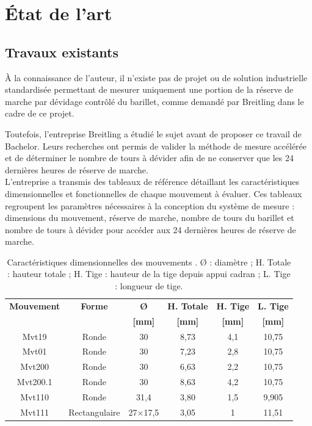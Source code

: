 \chapter{État de l'art}

\section{Travaux existants}

À la connaissance de l'auteur, il n'existe pas de projet ou de solution industrielle standardisée permettant de mesurer uniquement une portion de la réserve de marche par dévidage contrôlé du barillet, comme demandé par Breitling dans le cadre de ce projet.

Toutefois, l'entreprise Breitling a étudié le sujet avant de proposer ce travail de Bachelor. Leurs recherches ont permis de valider la méthode de mesure accélérée et de déterminer le nombre de tours à dévider afin de ne conserver que les 24 dernières heures de réserve de marche.\\

L'entreprise a transmis des tableaux de référence détaillant les caractéristiques dimensionnelles et fonctionnelles de chaque mouvement à évaluer. Ces tableaux regroupent les paramètres nécessaires à la conception du système de mesure : dimensions du mouvement, réserve de marche, nombre de tours du barillet et nombre de tours à dévider pour accéder aux 24 dernières heures de réserve de marche.

\begin{table}[H]
    \centering
    \small
    \begin{tabular}{|c|c|c|c|c|c|}
        \hline
        \textbf{Mouvement} & \textbf{Forme} & \textbf{Ø} & \textbf{H. Totale} & \textbf{H. Tige} & \textbf{L. Tige} \\
        & & \textbf{[mm]} & \textbf{[mm]} & \textbf{[mm]} & \textbf{[mm]} \\
        \hline
        Mvt19 & Ronde & 30 & 8,73 & 4,1 & 10,75 \\
        Mvt01 & Ronde & 30 & 7,23 & 2,8 & 10,75 \\
        Mvt200 & Ronde & 30 & 6,63 & 2,2 & 10,75 \\
        Mvt200.1 & Ronde & 30 & 8,63 & 4,2 & 10,75 \\
        Mvt110 & Ronde & 31,4 & 3,80 & 1,5 & 9,905 \\
        Mvt111 & Rectangulaire & 27×17,5 & 3,05 & 1 & 11,51 \\
        \hline
    \end{tabular}
    \caption{Caractéristiques dimensionnelles des mouvements \cite{breitling_donnees_internes}. Ø : diamètre ; H. Totale : hauteur totale ; H. Tige : hauteur de la tige depuis appui cadran ; L. Tige : longueur de tige.}
    \label{tab:dimensions_mouvements}
\end{table}

